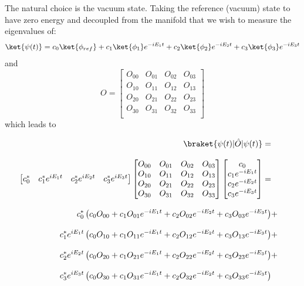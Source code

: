{The natural choice is the vacuum state.
Taking the reference (vacuum) state to have zero energy and decoupled from the manifold that we wish to measure the eigenvalues of:
\begin{equation*}
    \ket{\psi (t)} = c_0\ket{\phi_{ref}} + c_1\ket{\phi_1}e^{-i E_1 t} + c_2\ket{\phi_2}e^{-i E_2 t} + c_3\ket{\phi_3}e^{-i E_3 t}
\end{equation*}
and
\begin{equation*}
O =
\begin{bmatrix}
O_{00} & O_{01} & O_{02} & O_{03}\\
O_{10} & O_{11} & O_{12} & O_{13}\\
O_{20} & O_{21} & O_{22} & O_{23}\\
O_{30} & O_{31} & O_{32} & O_{33}\\
\end{bmatrix}
\end{equation*}
which leads to

\begin{equation*}
    \begin{aligned}
        \braket{\psi(t)|\hat{O}|\psi(t)} = \\[2.0ex]
        \begin{bmatrix}
            c_0^* & c_1^* e^{i E_1 t} & c_2^* e^{i E_2 t} & c_3^* e^{i E_3 t}
        \end{bmatrix}
        \begin{bmatrix}
            O_{00} & O_{01} & O_{02} & O_{03}\\
            O_{10} & O_{11} & O_{12} & O_{13}\\
            O_{20} & O_{21} & O_{22} & O_{23}\\
            O_{30} & O_{31} & O_{32} & O_{33}\\
        \end{bmatrix}
        \begin{bmatrix}
            c_0  \\
            c_1 e^{-i E_1 t} \\
            c_2 e^{-i E_2 t} \\
            c_3 e^{-i E_3 t}
        \end{bmatrix} = \\[2.0 ex]
        c_0^* \left( c_0 O_{00} + c_1 O_{01} e^{-i E_1 t} + c_2 O_{02} e^{-i E_2 t} + c_3 O_{03} e^{-i E_3 t} \right)& + \\[2.0 ex]
        c_1^* e^{i E_1 t} \left( c_0 O_{10} + c_1 O_{11} e^{-i E_1 t} + c_2 O_{12} e^{-i E_2 t} + c_3 O_{13} e^{-i E_3 t} \right)& +\\[2.0 ex]
        c_2^* e^{i E_2 t} \left( c_0 O_{20} + c_1 O_{21} e^{-i E_1 t} + c_2 O_{22} e^{-i E_2 t} + c_3 O_{23} e^{-i E_3 t} \right)& +\\[2.0 ex]
        c_3^* e^{i E_3 t} \left( c_0 O_{30} + c_1 O_{31} e^{-i E_1 t} + c_2 O_{32} e^{-i E_2 t} + c_3 O_{33} e^{-i E_3 t} \right)& \\[2.0 ex]
    \end{aligned}
\end{equation*}


}
